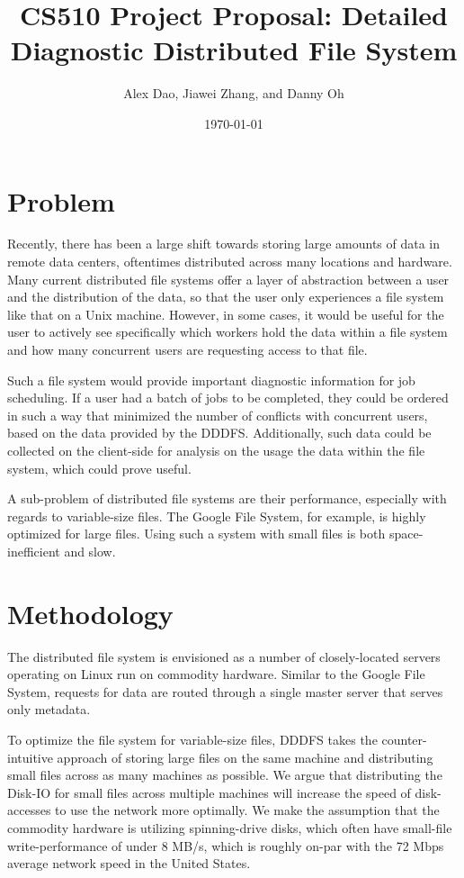 \documentclass{article}
\title{CS510 Project Proposal: Detailed Diagnostic Distributed File System}
\date{\today}
\author{Alex Dao, Jiawei Zhang, and Danny Oh}
\begin{document}
\maketitle

\section{Problem}
Recently, there has been a large shift towards storing large amounts of data in remote data centers, oftentimes distributed across many locations and hardware. Many current distributed file systems offer a layer of abstraction between a user and the distribution of the data, so that the user only experiences a file system like that on a Unix machine. However, in some cases, it would be useful for the user to actively see specifically which workers hold the data within a file system and how many concurrent users are requesting access to that file. 

Such a file system would provide important diagnostic information for job scheduling. If a user had a batch of jobs to be completed, they could be ordered in such a way that minimized the number of conflicts with concurrent users, based on the data provided by the DDDFS. Additionally, such data could be collected on the client-side for analysis on the usage the data within the file system, which could prove useful.

A sub-problem of distributed file systems are their performance, especially with regards to variable-size files. The Google File System, for example, is highly optimized for large files. Using such a system with small files is both space-inefficient and slow. 

\section{Methodology} 

The distributed file system is envisioned as a number of closely-located servers operating on Linux run on commodity hardware. Similar to the Google File System, requests for data are routed through a single master server that serves only metadata. 

To optimize the file system for variable-size files, DDDFS takes the counter-intuitive approach of storing large files on the same machine and distributing small files across as many machines as possible. We argue that distributing the Disk-IO for small files across multiple machines will increase the speed of disk-accesses to use the network more optimally. We make the assumption that the commodity hardware is utilizing spinning-drive disks, which often have small-file write-performance of under 8 MB/s, which is roughly on-par with the 72 Mbps average network speed in the United States. 
\end{document}
